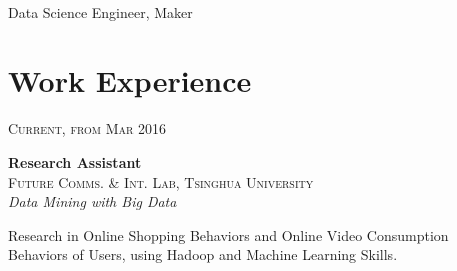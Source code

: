 \documentclass[10pt]{article} %
\begin{document}
\color{text1} %


\par{\\ %
{\color{headings} Data Science Engineer, Maker}\\[5pt]

	

\begin{minipage}[t]{0.5\textwidth} %
\vspace{0pt} %
	

\section{Work Experience} 


{\raggedleft\textsc{Current, from Mar 2016}\par}

{\raggedright\large \textbf{Research Assistant} \\ \textsc{Future Comms. \& Int. Lab, Tsinghua University}
\\
\textit{Data Mining with Big Data}\\[5pt]}

\normalsize{Research in Online Shopping Behaviors and Online Video Consumption Behaviors of Users, using Hadoop and Machine Learning Skills.}\\



\end{minipage}}
\end{document}
